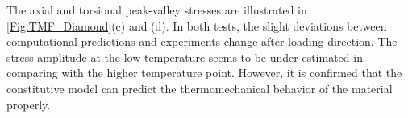 The axial and torsional peak-valley stresses are illustrated in  \ref{Fig:TMF_Diamond}(c) and (d).
In both tests, the slight deviations between computational predictions and experiments change after loading direction. The stress amplitude at the low temperature seems to be under-estimated in comparing with the higher temperature point. However, it is confirmed that the constitutive model can predict the thermomechanical behavior of the material properly.



